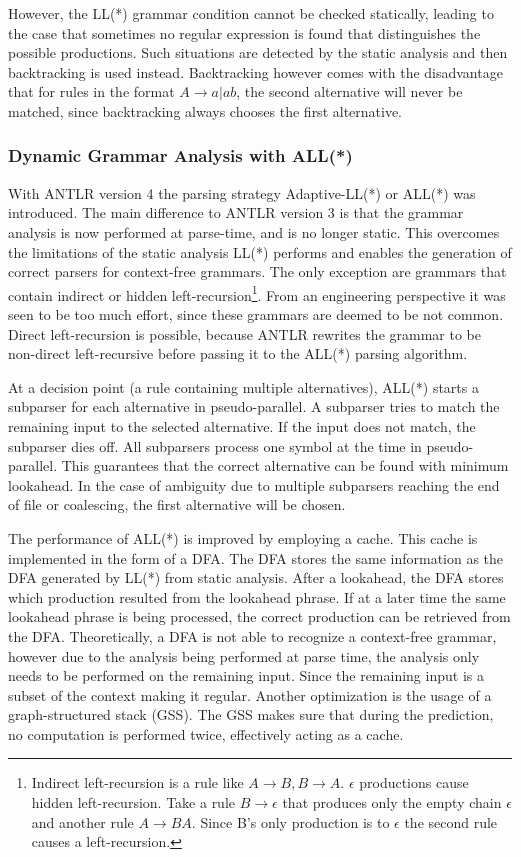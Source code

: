 However, the LL(*) grammar condition cannot be checked statically, leading to the case that sometimes no regular expression is found that distinguishes the possible productions. Such situations are detected by the static analysis and then backtracking is used instead. Backtracking however comes with the disadvantage that for rules in the format $A \rightarrow a | ab$, the second alternative will never be matched, since backtracking always chooses the first alternative. 

\subsubsection{Dynamic Grammar Analysis with ALL(*)}

With ANTLR version 4 the parsing strategy Adaptive-LL(*) or ALL(*) was introduced. The main difference to ANTLR version 3 is that the grammar analysis is now performed at parse-time, and is no longer static. This overcomes the limitations of the static analysis LL(*) performs and enables the generation of correct parsers for context-free grammars. The only exception are grammars that contain indirect or hidden left-recursion\footnote{Indirect left-recursion is a rule like $A \rightarrow B, B \rightarrow A$. $\epsilon$ productions cause hidden left-recursion. Take a rule $B \rightarrow \epsilon$ that produces only the empty chain $\epsilon$ and another rule $A \rightarrow BA$. Since B's only production is to $\epsilon$ the second rule causes a left-recursion. }. From an engineering perspective it was seen to be too much effort, since these grammars are deemed to be not common. Direct left-recursion is possible, because ANTLR rewrites the grammar to be non-direct left-recursive before passing it to the ALL(*) parsing algorithm. 

At a decision point (a rule containing multiple alternatives), ALL(*) starts a subparser for each alternative in pseudo-parallel. A subparser tries to match the remaining input to the selected alternative. If the input does not match, the subparser dies off. All subparsers process one symbol at the time in pseudo-parallel. This guarantees that the correct alternative can be found with minimum lookahead. In the case of ambiguity due to multiple subparsers reaching the end of file or coalescing, the first alternative will be chosen. 

The performance of ALL(*) is improved by employing a cache. This cache is implemented in the form of a DFA. The DFA stores the same information as the DFA generated by LL(*) from static analysis. After a lookahead, the DFA stores which production resulted from the lookahead phrase. If at a later time the same lookahead phrase is being processed, the correct production can be retrieved from the DFA. Theoretically, a DFA is not able to recognize a context-free grammar, however due to the analysis being performed at parse time, the analysis only needs to be performed on the remaining input. Since the remaining input is a subset of the context making it regular. Another optimization is the usage of a graph-structured stack (GSS). The GSS makes sure that during the prediction, no computation is performed twice, effectively acting as a cache. 

